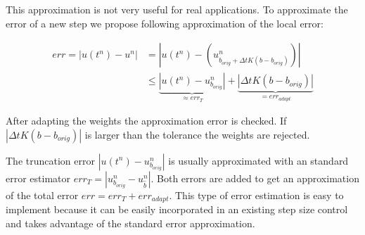 \documentclass[a4paper]{scrartcl}
\numberwithin{equation}{section}
\theoremstyle{plain}
\theoremstyle{definition}
\numberwithin{theorem}{section}
\newcommand{\dt}{{\Delta t}}
\newcommand{\1}{\mathbbm{1}}
\begin{document}
This approximation is not very useful for real applications. 
To approximate the error of a new step we propose following approximation of the local error:

\begin{align}
err = |u(t^n)-u^n| &= |u(t^n) - (u^n_{b_{orig}+\dt K(b-b_{orig})})| \\
 &\leq \underbrace{|u(t^n)-u^n_{b_{orig}}|}_{\approx err_T}+\underbrace{|\dt K(b-b_{orig})|}_{= err_{adapt}} \label{eq:Err}
\end{align}

After adapting the weights the approximation error is checked. If $|\dt K(b-b_{orig})|$ is larger than the tolerance the weights are rejected. 

The truncation error $|u(t^n)-u^n_{b_{orig}}|$ is usually approximated with an standard error estimator $err_T = | u^{n}_{b_{orig}} - u^{n}_{\hat{b}} |$.
Both errors are added to get an approximation of the total error $err = err_T + err_{adapt}$. %
This type of error estimation is easy to implement because it can be easily incorporated in an existing step size control and takes advantage of the standard error approximation.

\end{document}

